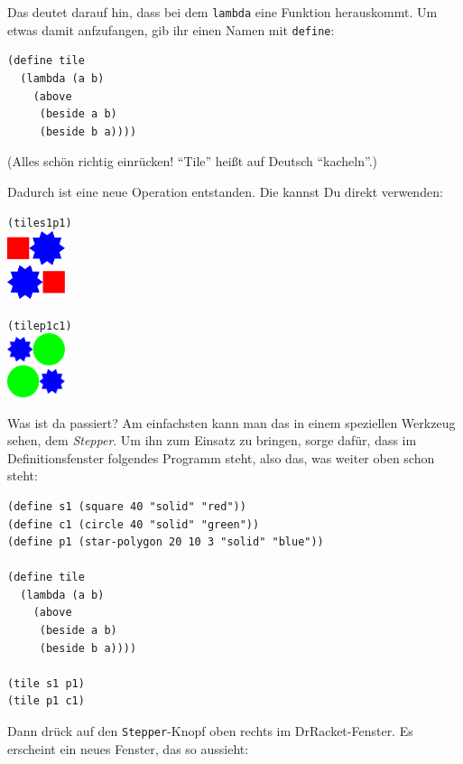 Das deutet darauf hin, dass bei dem \texttt{lambda} eine Funktion
herauskommt.  Um etwas damit anfzufangen, gib ihr einen Namen mit
\texttt{define}:
%
\begin{verbatim}
(define tile
  (lambda (a b)
    (above
     (beside a b)
     (beside b a))))
\end{verbatim}
%
(Alles schön richtig einrücken! "`Tile"' heißt auf Deutsch
"`kacheln"'.)

Dadurch ist eine neue Operation entstanden.  Die kannst Du direkt
verwenden:
%
\begin{alltt}
(tile s1 p1)
\evalsto{} \includegraphics[width=48pt]{i1prog/tile1}

(tile p1 c1)
\evalsto{} \includegraphics[width=48pt]{i1prog/tile2}
\end{alltt}
%
Was ist da passiert?  Am einfachsten kann man das in einem speziellen
Werkzeug sehen, dem \textit{Stepper}.  Um ihn zum
Einsatz zu bringen, sorge dafür, dass im Definitionsfenster folgendes
Programm steht, also das, was weiter oben schon steht:
%
\begin{verbatim}
(define s1 (square 40 "solid" "red"))
(define c1 (circle 40 "solid" "green"))
(define p1 (star-polygon 20 10 3 "solid" "blue"))

(define tile
  (lambda (a b)
    (above
     (beside a b)
     (beside b a))))

(tile s1 p1)
(tile p1 c1)
\end{verbatim}
%
Dann drück auf den \texttt{Stepper}-Knopf oben rechts im
DrRacket-Fenster.  Es erscheint ein neues Fenster, das so aussieht:

